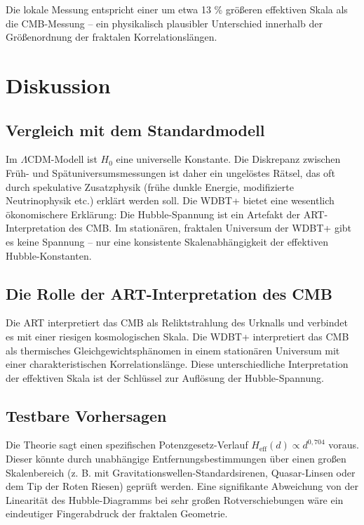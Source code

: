 \documentclass[11pt]{article}
\begin{document}
Die lokale Messung entspricht einer um etwa 13 \% größeren effektiven Skala als die CMB-Messung – ein physikalisch plausibler Unterschied innerhalb der Größenordnung der fraktalen Korrelationslängen.

\section{Diskussion}

\subsection{Vergleich mit dem Standardmodell}

Im \(\Lambda\)CDM-Modell ist \( H_0 \) eine universelle Konstante. Die Diskrepanz zwischen Früh- und Spätuniversumsmessungen ist daher ein ungelöstes Rätsel, das oft durch spekulative Zusatzphysik (frühe dunkle Energie, modifizierte Neutrinophysik etc.) erklärt werden soll. Die WDBT+ bietet eine wesentlich ökonomischere Erklärung: Die Hubble-Spannung ist ein Artefakt der ART-Interpretation des CMB. Im stationären, fraktalen Universum der WDBT+ gibt es keine Spannung – nur eine konsistente Skalenabhängigkeit der effektiven Hubble-Konstanten.

\subsection{Die Rolle der ART-Interpretation des CMB}

Die ART interpretiert das CMB als Reliktstrahlung des Urknalls und verbindet es mit einer riesigen kosmologischen Skala. Die WDBT+ interpretiert das CMB als thermisches Gleichgewichtsphänomen in einem stationären Universum mit einer charakteristischen Korrelationslänge. Diese unterschiedliche Interpretation der effektiven Skala ist der Schlüssel zur Auflösung der Hubble-Spannung.

\subsection{Testbare Vorhersagen}

Die Theorie sagt einen spezifischen Potenzgesetz-Verlauf \( H_{\text{eff}}(d) \propto d^{0,704} \) voraus. Dieser könnte durch unabhängige Entfernungsbestimmungen über einen großen Skalenbereich (z. B. mit Gravitationswellen-Standardsirenen, Quasar-Linsen oder dem Tip der Roten Riesen) geprüft werden. Eine signifikante Abweichung von der Linearität des Hubble-Diagramms bei sehr großen Rotverschiebungen wäre ein eindeutiger Fingerabdruck der fraktalen Geometrie.
\end{document}
